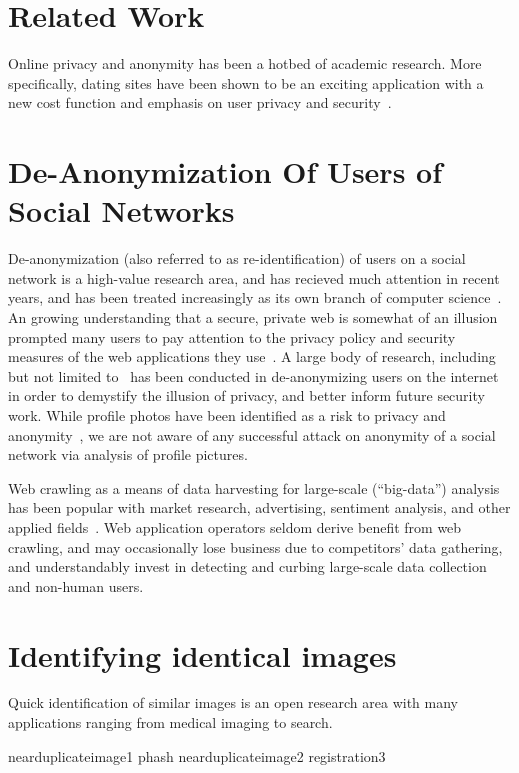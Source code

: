 \section{Related Work}
\label{sec:related}

Online privacy and anonymity has been a hotbed of academic research.
More specifically, dating sites have been shown to be an exciting application with a new cost function and emphasis on user privacy and security~\cite{okws}.


\section{De-Anonymization Of Users of Social Networks}
\label{sec:related_anon}

De-anonymization (also referred to as re-identification) of users on a social network is a high-value research area, and has recieved much attention in recent years, and has been treated increasingly as its own branch of computer science~\cite{reidentification1}.
An growing understanding that a secure, private web is somewhat of an illusion~\cite{webisnotsecure} prompted many users to pay attention to the privacy policy and security measures of the web applications they use~\cite{motivationforanonymity}.
A large body of research, including but not limited to~\cite{deanonsocial1,deanonsocial2,locationprivacy} has been conducted in de-anonymizing users on the internet in order to demystify the illusion of privacy, and better inform future security work.
While profile photos have been identified as a risk to privacy and anonymity~\cite{profilephotos1}, we are not aware of any successful attack on anonymity of a social network via analysis of profile pictures.

Web crawling as a means of data harvesting for large-scale (``big-data'') analysis has been popular with market research, advertising, sentiment analysis, and other applied fields~\cite{crawling1}.
Web application operators seldom derive benefit from web crawling, and may occasionally lose business due to competitors' data gathering, and understandably invest in detecting and curbing large-scale data collection~\cite{limitcrawling1, limitcrawling2, protectidentity1, protectidentity2} and non-human users.

\section{Identifying identical images}
\label{sec:related_images}

Quick identification of similar images is an open research area with many applications ranging from medical imaging to search.

nearduplicateimage1
phash
nearduplicateimage2
registration3